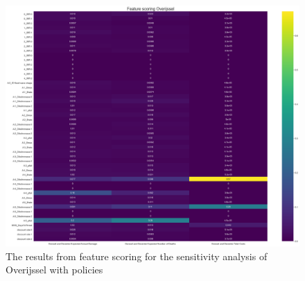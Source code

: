 \begin{figure}[h!]
    \centering
    \includegraphics[width=\textwidth]{report/figures/results/Feature_scoring_Overijssel_100scen.png}
    \caption{The results from feature scoring for the sensitivity analysis of Overijssel with policies}
    \label{fig:feat-scor-o}
\end{figure}

\newpage